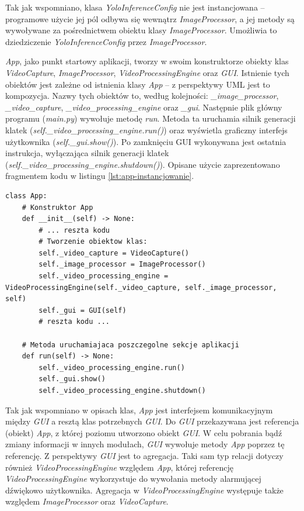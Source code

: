 Tak jak wspomniano, klasa \emph{YoloInferenceConfig} nie jest instancjowana – programowe użycie jej pól odbywa się wewnątrz \emph{ImageProcessor}, a jej metody są wywoływane za pośrednictwem obiektu klasy \emph{ImageProcessor}. Umożliwia to dziedziczenie \emph{YoloInferenceConfig} przez \emph{ImageProcessor}.

\emph{App}, jako punkt startowy aplikacji, tworzy w swoim konstruktorze obiekty klas \emph{VideoCapture}, \emph{ImageProcessor}, \emph{VideoProcessingEngine} oraz \emph{GUI}. Istnienie tych obiektów jest zależne od istnienia klasy \emph{App} – z perspektywy UML jest to kompozycja. Nazwy tych obiektów to, według kolejności: \emph{\_image\_processor}, \emph{\_video\_capture}, \emph{\_video\_processing\_engine} oraz \emph{\_gui}. Następnie plik główny programu (\emph{main.py}) wywołuje metodę \emph{run}. Metoda ta uruchamia silnik generacji klatek (\emph{self.\_video\_processing\_engine.run()}) oraz wyświetla graficzny interfejs użytkownika (\emph{self.\_gui.show()}). Po zamknięciu GUI wykonywana jest ostatnia instrukcja, wyłączająca silnik generacji klatek (\emph{self.\_video\_processing\_engine.shutdown()}). Opisane użycie zaprezentowano fragmentem kodu w listingu \ref{lst:app-instancjowanie}.

\begin{lstlisting}[caption={Tworzenie obiektów klas wewnątrz \emph{App} oraz uruchomienie w niej różnych sekcji aplikacji.}, label={lst:app-instancjowanie}]
class App:
    # Konstruktor App
    def __init__(self) -> None:
        # ... reszta kodu
        # Tworzenie obiektow klas:
        self._video_capture = VideoCapture()
        self._image_processor = ImageProcessor()
        self._video_processing_engine = VideoProcessingEngine(self._video_capture, self._image_processor, self)
        self._gui = GUI(self)
        # reszta kodu ...

    # Metoda uruchamiajaca poszczegolne sekcje aplikacji
    def run(self) -> None:
        self._video_processing_engine.run()
        self._gui.show()
        self._video_processing_engine.shutdown()
\end{lstlisting}

Tak jak wspomniano w opisach klas, \emph{App} jest interfejsem komunikacyjnym między \emph{GUI} a resztą klas potrzebnych \emph{GUI}. Do \emph{GUI} przekazywana jest referencja (obiekt) \emph{App}, z której poziomu utworzono obiekt \emph{GUI}. W celu pobrania bądź zmiany informacji w innych modułach, \emph{GUI} wywołuje metody \emph{App} poprzez tę referencję. Z perspektywy \emph{GUI} jest to agregacja. Taki sam typ relacji dotyczy również \emph{VideoProcessingEngine} względem \emph{App}, której referencję \emph{VideoProcessingEngine} wykorzystuje do wywołania metody alarmującej dźwiękowo użytkownika. Agregacja w \emph{VideoProcessingEngine} występuje także względem \emph{ImageProcessor} oraz \emph{VideoCapture}.

